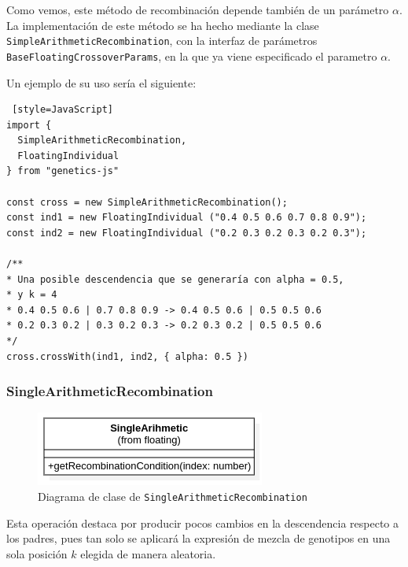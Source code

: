 Como vemos, este método de recombinación depende también de un parámetro $\alpha$. \\

La implementación de este método se ha hecho mediante la clase \texttt{SimpleArithmeticRecombination}, con la interfaz de parámetros \texttt{BaseFloatingCrossoverParams}, en la que ya viene especificado el parametro $\alpha$. \\

\clearpage

Un ejemplo de su uso sería el siguiente: \\

\begin{lstlisting} [style=JavaScript]
import { 
  SimpleArithmeticRecombination, 
  FloatingIndividual 
} from "genetics-js"

const cross = new SimpleArithmeticRecombination();
const ind1 = new FloatingIndividual ("0.4 0.5 0.6 0.7 0.8 0.9");
const ind2 = new FloatingIndividual ("0.2 0.3 0.2 0.3 0.2 0.3");

/**
* Una posible descendencia que se generaría con alpha = 0.5,
* y k = 4
* 0.4 0.5 0.6 | 0.7 0.8 0.9 -> 0.4 0.5 0.6 | 0.5 0.5 0.6 
* 0.2 0.3 0.2 | 0.3 0.2 0.3 -> 0.2 0.3 0.2 | 0.5 0.5 0.6
*/
cross.crossWith(ind1, ind2, { alpha: 0.5 })
\end{lstlisting}

\subsubsection{SingleArithmeticRecombination}

\begin{figure}[ht]
    \centering
    \includegraphics[scale=0.7]{mem/images/cap-4/4.2.6(Crossover)/SingleArithmetic.png}
    \caption{Diagrama de clase de \texttt{SingleArithmeticRecombination}}
    \label{fig:my_label}
\end{figure}


Esta operación destaca por producir pocos cambios en la descendencia respecto a los padres, pues tan solo se aplicará la expresión de mezcla de genotipos en una sola posición $k$ elegida de manera aleatoria. \\

